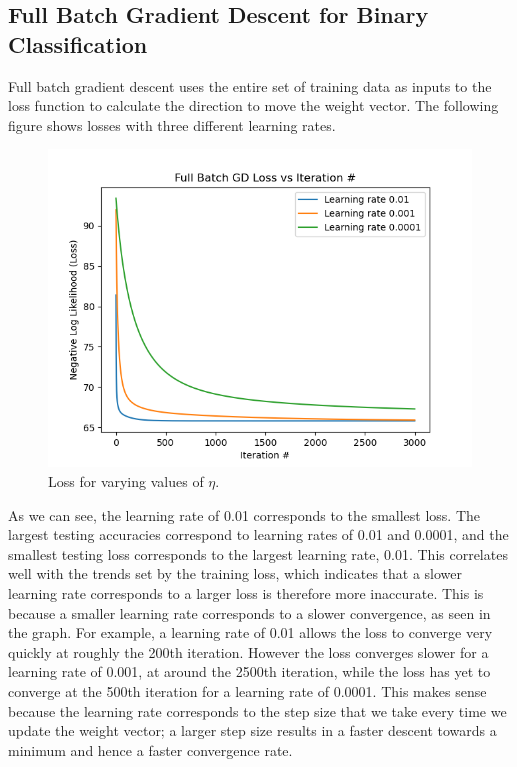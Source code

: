 \documentclass[11pt,letterpaper,titlepage]{article}
\begin{document}
	\subsection{Full Batch Gradient Descent for Binary Classification}
	Full batch gradient descent uses the entire set of training data as inputs to the loss function to calculate the direction to move the weight vector. The following figure shows losses with three different learning rates.
	\begin{figure}[H]
		\includegraphics[width=\linewidth]{Full Batch GD.png}
		\caption{Loss for varying values of $\eta$.}
		\label{fig:Full Batch GD}
	\end{figure}
 	As we can see, the learning rate of 0.01 corresponds to the smallest loss. The largest testing accuracies correspond to learning rates of 0.01 and 0.0001, and the smallest testing loss corresponds to the largest learning rate, 0.01. This correlates well with the trends set by the training loss, which indicates that a slower learning rate corresponds to a larger loss is therefore more inaccurate. This is because a smaller learning rate corresponds to a slower convergence, as seen in the graph.
 	For example, a learning rate of 0.01 allows the loss to converge very quickly at roughly the 200th iteration. However the loss converges slower for a learning rate of 0.001, at around the 2500th iteration, while the loss has yet to converge at the 500th iteration for a learning rate of 0.0001. This makes sense because the learning rate corresponds to the step size that we take every time we update the weight vector; a larger step size results in a faster descent towards a minimum and hence a faster convergence rate.
 	
\end{document}

